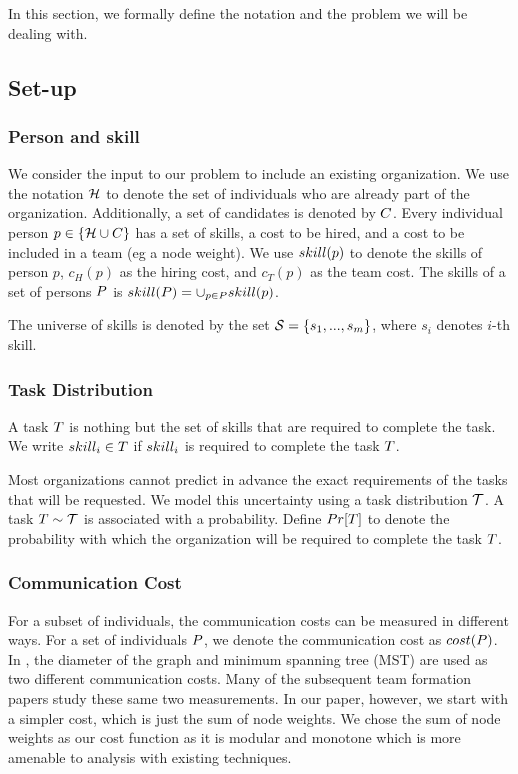 In this section, we formally define the notation and the problem we will be dealing with.
\subsection{Set-up}

\subsubsection{Person and skill}

We consider the input to our problem to include an existing organization.
We use the notation $\mathcal{H}$ to denote the set of individuals who are already part of the organization.
Additionally, a set of candidates is denoted by ${C}$.
Every individual person $p \in \{\mathcal{H} \cup {C}\}$ has a set of skills, a cost to be hired, and a cost to be included in a team (eg a node weight).
We use $skill(p)$ to denote the skills of person $p$, $c_H(p)$ as the hiring cost, and $c_T(p)$ as the team cost.
The skills of a set of persons $P$ is $skill(P) = \cup_{p \in P} skill(p)$.

The universe of skills is denoted by the set $\mathcal{S} = \{ s_1, ..., s_m \}$, where $s_i$ denotes $i$-th skill.

\subsubsection{Task Distribution}

A task $T$ is nothing but the set of skills that are required to complete the task.
We write $skill_i \in T$ if $skill_i$ is required to complete the task $T$.

Most organizations cannot predict in advance the exact requirements of the tasks that will be requested.
We model this uncertainty using a task distribution $\mathcal{T}$. 
A task $T \sim \mathcal{T}$ is associated with a probability.
Define $Pr[T]$ to denote the probability with which the organization will be required to complete the task $T$. 


\subsubsection{Communication Cost}
For a subset of individuals, the communication costs can be measured in different ways. 
For a set of individuals $P$, we denote the communication cost as $cost(P)$. 
In \cite{lappas2009finding}, the diameter of the graph and minimum spanning tree (MST) are used as two different communication costs.
Many of the subsequent team formation papers study these same two measurements.
In our paper, however, we start with a simpler cost, which is just the sum of node weights. We chose the sum of node weights as our cost function as it is modular and monotone which is more amenable to analysis with existing techniques. 

